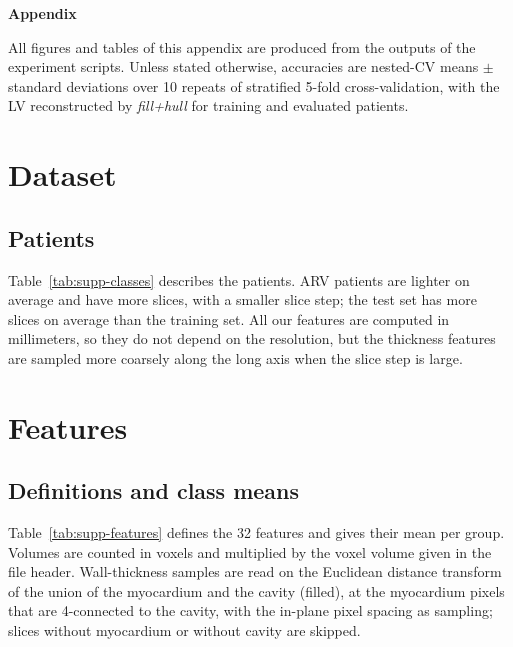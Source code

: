 
\begin{center}
  {\LARGE\bfseries Appendix}
\end{center}

All figures and tables of this appendix are produced from the outputs of the experiment scripts. Unless stated otherwise, accuracies are nested-CV means $\pm$ standard deviations over 10 repeats of stratified 5-fold cross-validation, with the LV reconstructed by \emph{fill+hull} for training and evaluated patients.

\startcontents[appendix]

\clearpage
\section{Dataset}
\label{app:data}

\subsection{Patients}
Table~\ref{tab:supp-classes} describes the patients. ARV patients are lighter on average and have more slices, with a smaller slice step; the test set has more slices on average than the training set. All our features are computed in millimeters, so they do not depend on the resolution, but the thickness features are sampled more coarsely along the long axis when the slice step is large.



\clearpage
\section{Features}
\label{app:features}

\subsection{Definitions and class means}
Table~\ref{tab:supp-features} defines the 32 features and gives their mean per group. Volumes are counted in voxels and multiplied by the voxel volume given in the file header. Wall-thickness samples are read on the Euclidean distance transform of the union of the myocardium and the cavity (filled), at the myocardium pixels that are 4-connected to the cavity, with the in-plane pixel spacing as sampling; slices without myocardium or without cavity are skipped.

